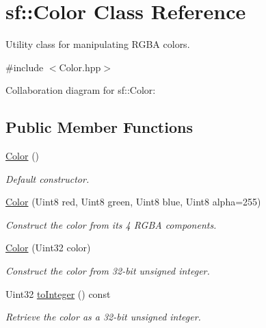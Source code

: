 \hypertarget{classsf_1_1_color}{}\section{sf\+:\+:Color Class Reference}
\label{classsf_1_1_color}


Utility class for manipulating R\+G\+BA colors.  




{\ttfamily \#include $<$Color.\+hpp$>$}



Collaboration diagram for sf\+:\+:Color\+:
\subsection*{Public Member Functions}
\begin{DoxyCompactItemize}
\item 
\hyperlink{classsf_1_1_color_ac2eb4393fb11ad3fa3ccf34e92fe08e4}{Color} ()
\begin{DoxyCompactList}\small\item\em Default constructor. \end{DoxyCompactList}\item 
\hyperlink{classsf_1_1_color_ac791dc61be4c60baac50fe700f1c9850}{Color} (Uint8 red, Uint8 green, Uint8 blue, Uint8 alpha=255)
\begin{DoxyCompactList}\small\item\em Construct the color from its 4 R\+G\+BA components. \end{DoxyCompactList}\item 
\hyperlink{classsf_1_1_color_a5449f4b2b9a78230d40ce2c223c9ab2e}{Color} (Uint32 color)
\begin{DoxyCompactList}\small\item\em Construct the color from 32-\/bit unsigned integer. \end{DoxyCompactList}\item 
Uint32 \hyperlink{classsf_1_1_color_abb46e6942c4fe0d221574a46e642caa9}{to\+Integer} () const
\begin{DoxyCompactList}\small\item\em Retrieve the color as a 32-\/bit unsigned integer. \end{DoxyCompactList}\end{DoxyCompactItemize}
